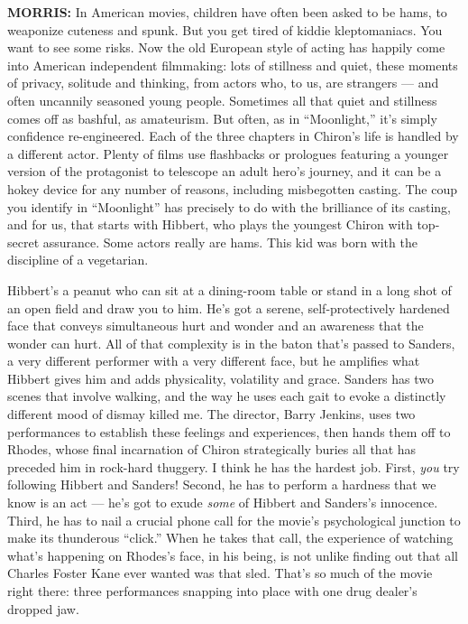\textbf{MORRIS:} In American movies, children have often been asked to
be hams, to weaponize cuteness and spunk. But you get tired of kiddie
kleptomaniacs. You want to see some risks. Now the old European style of
acting has happily come into American independent filmmaking: lots of
stillness and quiet, these moments of privacy, solitude and thinking,
from actors who, to us, are strangers --- and often uncannily seasoned
young people. Sometimes all that quiet and stillness comes off as
bashful, as amateurism. But often, as in ``Moonlight,'' it's simply
confidence re-engineered. Each of the three chapters in Chiron's life is
handled by a different actor. Plenty of films use flashbacks or
prologues featuring a younger version of the protagonist to telescope an
adult hero's journey, and it can be a hokey device for any number of
reasons, including misbegotten casting. The coup you identify in
``Moonlight'' has precisely to do with the brilliance of its casting,
and for us, that starts with Hibbert, who plays the youngest Chiron with
top-secret assurance. Some actors really are hams. This kid was born
with the discipline of a vegetarian.

Hibbert's a peanut who can sit at a dining-room table or stand in a long
shot of an open field and draw you to him. He's got a serene,
self-protectively hardened face that conveys simultaneous hurt and
wonder and an awareness that the wonder can hurt. All of that complexity
is in the baton that's passed to Sanders, a very different performer
with a very different face, but he amplifies what Hibbert gives him and
adds physicality, volatility and grace. Sanders has two scenes that
involve walking, and the way he uses each gait to evoke a distinctly
different mood of dismay killed me. The director, Barry Jenkins, uses
two performances to establish these feelings and experiences, then hands
them off to Rhodes, whose final incarnation of Chiron strategically
buries all that has preceded him in rock-hard thuggery. I think he has
the hardest job. First, \emph{you} try following Hibbert and Sanders!
Second, he has to perform a hardness that we know is an act --- he's got
to exude \emph{some} of Hibbert and Sanders's innocence. Third, he has
to nail a crucial phone call for the movie's psychological junction to
make its thunderous ``click.'' When he takes that call, the experience
of watching what's happening on Rhodes's face, in his being, is not
unlike finding out that all Charles Foster Kane ever wanted was that
sled. That's so much of the movie right there: three performances
snapping into place with one drug dealer's dropped jaw.

